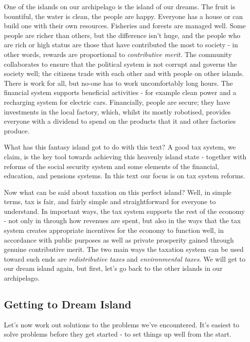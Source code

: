 \documentclass[]{tufte-handout}
\begin{document}
One of the islands on our archipelago is the island of our dreams. The
fruit is bountiful, the water is clean, the people are happy. Everyone
has a house or can build one with their own resources. Fisheries and
forests are managed well. Some people are richer than others, but the
difference isn't huge, and the people who are rich or high status are
those that have contributed the most to society - in other words,
rewards are proportional to \emph{contributive merit.} The community
collaborates to ensure that the political system is not corrupt and
governs the society well; the citizens trade with each other and with
people on other islands. There is work for all, but no-one has to work
uncomfortably long hours. The financial system supports beneficial
activities - for example clean power and a recharging system for
electric cars. Financially, people are secure; they have investments in
the local factory, which, whilst its mostly robotised, provides everyone
with a dividend to spend on the products that it and other factories
produce.

What has this fantasy island got to do with this text? A good tax
system, we claim, is the key tool towards achieving this heavenly island
state - together with reforms of the social security system and some
elements of the financial, education, and pensions systems. In this text
our focus is on tax system reforms.

Now what can be said about taxation on this perfect island? Well, in
simple terms, tax is fair, and fairly simple and straightforward for
everyone to understand. In important ways, the tax system supports the
rest of the economy - not only in through how revenues are spent, but
also in the ways that the tax system creates appropriate incentives for
the economy to function well, in accordance with public purposes as well
as private prosperity gained through genuine contributive merit. The two
main ways the taxation system can be used toward such ends are
\emph{redistributive taxes} and \emph{environmental taxes}. We will get
to our dream island again, but first, let's go back to the other islands
in our archipelago.

\hypertarget{getting-to-dream-island}{%
\subsection{Getting to Dream Island}\label{getting-to-dream-island}}

Let's now work out solutions to the problems we've encountered. It's
easiest to solve problems before they get started - to set things up
well from the start.
\end{document}
